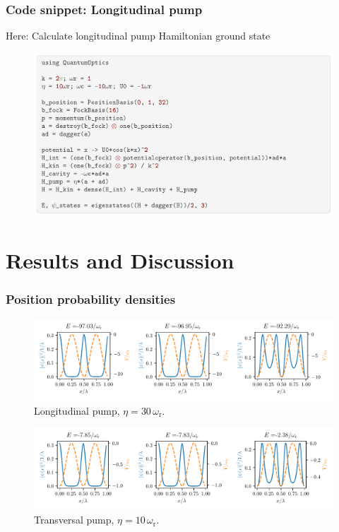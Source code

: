 \documentclass[pdflatex,compress]{beamer}
\begin{document}
\begin{frame}
\frametitle{Code snippet: Longitudinal pump}
\vspace{-1em}
Here: Calculate longitudinal pump Hamiltonian ground state
\vspace{-0.5em}
\begin{figure}
\centering
\includegraphics[width=1\textwidth]{images/code_screenshot.png}
\end{figure}
\end{frame}

\section{Results and Discussion}


\begin{frame}
\frametitle{Position probability densities}
\vspace{-1.5em}
\begin{figure}
\centering
\includegraphics[width=1\textwidth]{images/dens_long.pdf}
\vspace*{-11mm}
\caption{Longitudinal pump, $\eta = 30 \, \omega_\text{r}$.}
\end{figure}
\vspace{-1em}
\begin{figure}
\centering
\includegraphics[width=1\textwidth]{images/dens_trans.pdf}
\vspace*{-11mm}
\caption{Transversal pump, $\eta = 10 \, \omega_\text{r}$.}
\end{figure}
\end{frame}
\end{document}
